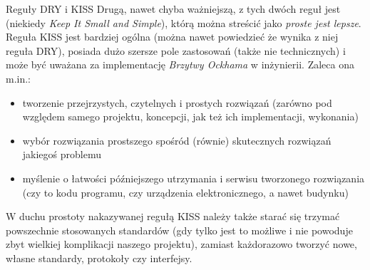 \begin{ProTip}[breakable]{Reguły DRY i KISS}
Drugą, nawet chyba ważniejszą, z tych dwóch reguł jest  (niekiedy \textit{Keep It Small and Simple}), którą można streścić jako \textit{proste jest lepsze}.
Reguła KISS jest bardziej ogólna (można nawet powiedzieć że wynika z niej reguła DRY), posiada dużo szersze pole zastosowań (także nie technicznych) i może być uważana za implementację \textit{Brzytwy Ockhama} w inżynierii.
Zaleca ona m.in.:
\begin{itemize}
\item tworzenie przejrzystych, czytelnych i prostych rozwiązań (zarówno pod względem samego projektu, koncepcji, jak też ich implementacji, wykonania)
\item wybór rozwiązania prostszego spośród (równie) skutecznych rozwiązań jakiegoś problemu
\item myślenie o łatwości późniejszego utrzymania i serwisu tworzonego rozwiązania (czy to kodu programu, czy urządzenia elektronicznego, a nawet budynku)
\end{itemize}

W duchu prostoty nakazywanej regułą KISS należy także starać się trzymać powszechnie stosowanych standardów
(gdy tylko jest to możliwe i nie powoduje zbyt wielkiej komplikacji naszego projektu),
zamiast każdorazowo tworzyć nowe, własne standardy, protokoły czy interfejsy.
\end{ProTip}
